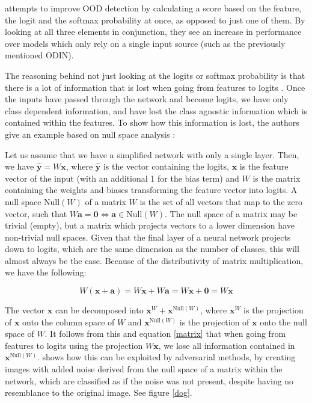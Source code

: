 \documentclass[conference]{IEEEtran}
\begin{document}
\cite{vim} attempts to improve OOD detection by calculating a score based on the feature, the logit and the softmax probability at once, as opposed to just one of them. By looking at all three elements in conjunction, they see an increase in performance over models which only rely on a single input source (such as the previously mentioned ODIN).

The reasoning behind not just looking at the logits or softmax probability is that there is a lot of information that is lost when going from features to logits \cite{vim}. Once the inputs have passed through the network and become logits, we have only class dependent information, and have lost the class agnostic information which is contained within the features. To show how this information is lost, the authors give an example based on null space analysis \cite{nusa}:

Let us assume that we have a simplified network with only a single layer. Then, we have $\hat{\bm{y}} = W \bm{x}$, where $\hat{\bm{y}}$ is the vector containing the logits, $\bm{x}$ is the feature vector of the input (with an additional 1 for the bias term) and $W$ is the matrix containing the weights and biases transforming the feature vector into logits. A null space $\text{Null}(W)$ of a matrix $W$ is the set of all vectors that map to the zero vector, such that $W \bm{a} = \bm{0} \iff \bm{a} \in \text{Null}(W)$. The null space of a matrix may be trivial (empty), but a matrix which projects vectors to a lower dimension have non-trivial null spaces. Given that the final layer of a neural network projects down to logits, which are the same dimension as the number of classes, this will almost always be the case. Because of the distributivity of matrix multiplication, we have the following:

\begin{equation}
W (\bm{x} + \bm{a}) = W \bm{x} + W \bm{a} = W \bm{x} + \bm{0} = W \bm{x}
\label{matrix}
\end{equation}

The vector $\bm{x}$ can be decomposed into $\bm{x}^W + \bm{x}^{\text{Null}(W)}$, where $\bm{x}^W$ is the projection of $\bm{x}$ onto the column space of $W$ and $\bm{x}^{\text{Null}(W)}$ is the projection of $\bm{x}$ onto the null space of $W$. It follows from this and equation \ref{matrix} that when going from features to logits using the projection $W \bm{x}$, we lose all information contained in $\bm{x}^{\text{Null}(W)}$. \cite{nusa} shows how this can be exploited by adversarial methods, by creating images with added noise derived from the null space of a matrix within the network, which are classified as if the noise was not present, despite having no resemblance to the original image. See figure \ref{dog}.
\end{document}
